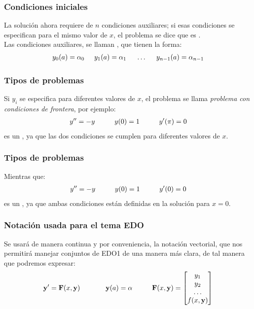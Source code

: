 \documentclass[12pt]{beamer}
\begin{document}
\begin{frame}
\frametitle{Condiciones iniciales}
La solución ahora requiere de $n$ condiciones auxiliares; si esas condiciones se especifican para el mismo valor de $x$, el problema se dice que es \emph{}.
\\
\medskip
\pause
Las condiciones auxiliares, se llaman \emph{}, que tienen la forma:
\pause
\begin{align*}
y_{0} (a) = \alpha_{0} \hspace{0.5cm} y_{1} (a) = \alpha_{1} \hspace{0.5cm} \ldots \hspace{0.5cm} y_{n-1} (a) = \alpha_{n-1}
\end{align*}
\end{frame}
\begin{frame}
\frametitle{Tipos de problemas}
Si $y_{i}$ se especifica para diferentes valores de $x$, el problema se llama \emph{problema con condiciones de frontera}, por ejemplo:
\pause
\begin{align*}
{y}^{\prime \prime} = - y \hspace{1cm} y (0) = 1 \hspace{1cm} {y}^{\prime} (\pi) = 0
\end{align*}
es un , ya que las dos condiciones se cumplen para diferentes valores de $x$.
\end{frame}
\begin{frame}
\frametitle{Tipos de problemas}
Mientras que:
\pause
\begin{align*}
{y}^{\prime \prime} = -y \hspace{1cm} y (0) = 1 \hspace{1cm} {y}^{\prime} (0) = 0
\end{align*}
es un , ya que ambas condiciones están definidas en la solución para $x = 0$.
\end{frame}
\begin{frame}
\frametitle{Notación usada para el tema EDO}
Se usará de manera continua y por conveniencia, la notación vectorial, que nos permitirá manejar conjuntos de EDO1 de una manera más clara, de tal manera que podremos expresar:
\pause
\renewcommand*{\arraystretch}{0.7}
\begin{eqnarray*}
\begin{aligned}
\mathbf{{y}^{\prime}} = \mathbf{F} (x, \mathbf{y}) \hspace{1.3cm} \mathbf{y} (a) = \alpha \hspace{1cm}
\mathbf{F} (x, \mathbf{y}) = \left[ \begin{matrix}
y_{1} \\
y_{2} \\
\ldots \\
f (x, \mathbf{y})
\end{matrix} \right]
\end{aligned}
\end{eqnarray*}
\end{frame}
\end{document}
